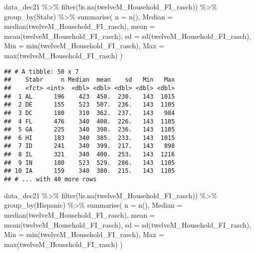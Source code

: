 \documentclass[
]{article}
\newenvironment{Shaded}{\begin{snugshade}}{\end{snugshade}}
\newcommand{\AttributeTok}[1]{\textcolor[rgb]{0.77,0.63,0.00}{#1}}
\newcommand{\FunctionTok}[1]{\textcolor[rgb]{0.00,0.00,0.00}{#1}}
\newcommand{\NormalTok}[1]{#1}
\newcommand{\SpecialCharTok}[1]{\textcolor[rgb]{0.00,0.00,0.00}{#1}}
\begin{document}
\begin{Shaded}
\begin{Highlighting}[]
\NormalTok{data\_dec21 }\SpecialCharTok{\%\textgreater{}\%} \FunctionTok{filter}\NormalTok{(}\SpecialCharTok{!}\FunctionTok{is.na}\NormalTok{(twelveM\_Household\_FI\_rasch)) }\SpecialCharTok{\%\textgreater{}\%} 
\FunctionTok{group\_by}\NormalTok{(Stabr) }\SpecialCharTok{\%\textgreater{}\%}
  \FunctionTok{summarise}\NormalTok{(}
    \AttributeTok{n =} \FunctionTok{n}\NormalTok{(),}
    \AttributeTok{Median =} \FunctionTok{median}\NormalTok{(twelveM\_Household\_FI\_rasch),}
    \AttributeTok{mean =} \FunctionTok{mean}\NormalTok{(twelveM\_Household\_FI\_rasch),}
    \AttributeTok{sd =} \FunctionTok{sd}\NormalTok{(twelveM\_Household\_FI\_rasch),}
    \AttributeTok{Min =} \FunctionTok{min}\NormalTok{(twelveM\_Household\_FI\_rasch),}
    \AttributeTok{Max =} \FunctionTok{max}\NormalTok{(twelveM\_Household\_FI\_rasch)}
\NormalTok{  )}
\end{Highlighting}
\end{Shaded}

\begin{verbatim}
## # A tibble: 50 x 7
##    Stabr     n Median  mean    sd   Min   Max
##    <fct> <int>  <dbl> <dbl> <dbl> <dbl> <dbl>
##  1 AL      196    423  450.  230.   143  1015
##  2 DE      155    523  507.  236.   143  1105
##  3 DC      180    310  362.  237.   143   984
##  4 FL      476    340  408.  226.   143  1105
##  5 GA      225    340  398.  236.   143  1105
##  6 HI      183    340  385.  233.   143  1015
##  7 ID      241    340  399.  217.   143   898
##  8 IL      321    340  400.  253.   143  1216
##  9 IN      180    523  529.  286.   143  1105
## 10 IA      159    340  380.  215.   143  1105
## # ... with 40 more rows
\end{verbatim}

\begin{Shaded}
\begin{Highlighting}[]
\NormalTok{data\_dec21 }\SpecialCharTok{\%\textgreater{}\%} \FunctionTok{filter}\NormalTok{(}\SpecialCharTok{!}\FunctionTok{is.na}\NormalTok{(twelveM\_Household\_FI\_rasch)) }\SpecialCharTok{\%\textgreater{}\%} 
\FunctionTok{group\_by}\NormalTok{(Hispanic) }\SpecialCharTok{\%\textgreater{}\%}
  \FunctionTok{summarise}\NormalTok{(}
    \AttributeTok{n =} \FunctionTok{n}\NormalTok{(),}
    \AttributeTok{Median =} \FunctionTok{median}\NormalTok{(twelveM\_Household\_FI\_rasch),}
    \AttributeTok{mean =} \FunctionTok{mean}\NormalTok{(twelveM\_Household\_FI\_rasch),}
    \AttributeTok{sd =} \FunctionTok{sd}\NormalTok{(twelveM\_Household\_FI\_rasch),}
    \AttributeTok{Min =} \FunctionTok{min}\NormalTok{(twelveM\_Household\_FI\_rasch),}
    \AttributeTok{Max =} \FunctionTok{max}\NormalTok{(twelveM\_Household\_FI\_rasch)}
\NormalTok{  )}
\end{Highlighting}
\end{Shaded}
\end{document}
